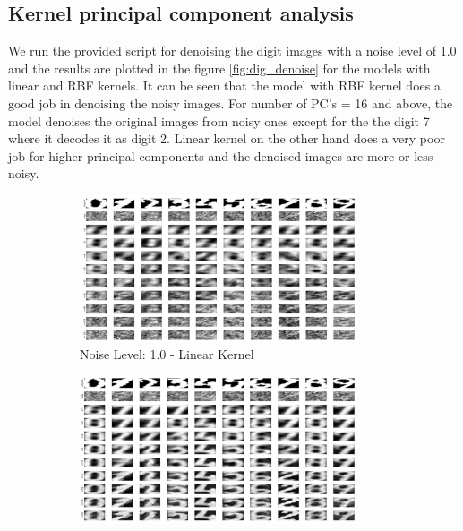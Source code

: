 \subsection{Kernel principal component analysis}
We run the provided script for denoising the digit images with a noise level of 1.0 and the results are plotted in the figure \ref{fig:dig_denoise} for the models with linear and RBF kernels. It can be seen that the model with RBF kernel does a good job in denoising the noisy images. For number of PC's = 16 and above, the model denoises the original images from noisy ones except for the the digit 7 where it decodes it as digit 2. Linear kernel on the other hand does a very poor job for higher principal components and the denoised images are more or less noisy. 
\begin{figure}[!htpb]
	\begin{subfigure}[b]{0.4\textwidth}
		\centering
		\includegraphics[height= 0.75\textwidth, width = 0.9\textwidth]{Exercise3/Report/dig_denoise_linear}
		\caption{Noise Level: 1.0 - Linear Kernel }\label{fig:dig_denoise_linear}
	\end{subfigure}%
	\begin{subfigure}[b]{0.4\textwidth}
		\centering
		\includegraphics[height= 0.75\textwidth, width = 0.9\textwidth]{Exercise3/Report/dig_denoise_rbf}

\end{subfigure}
\end{figure}
